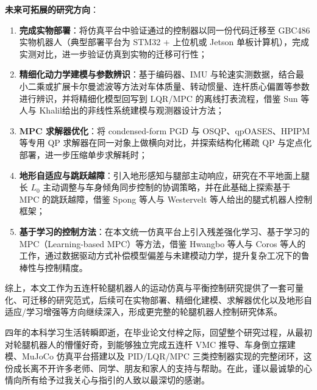 \documentclass{smbuthesis}
\begin{document}
\textbf{未来可拓展的研究方向}：

\begin{enumerate}
\item \textbf{完成实物部署}：将仿真平台中验证通过的控制器以同一份代码迁移至 GBC486 实物机器人（典型部署平台为 STM32 + 上位机或 Jetson 单板计算机），完成实测对比，进一步验证仿真到实物的迁移可行性；
\item \textbf{精细化动力学建模与参数辨识}：基于编码器、IMU 与轮速实测数据，结合最小二乘或扩展卡尔曼滤波等方法对车体质量、转动惯量、连杆质心偏置等参数进行辨识，并将精细化模型回写到 LQR/MPC 的离线打表流程，借鉴 Sun 等人\cite{Sun2020SMDOB}与 Khalil\cite{Khalil2002Nonlinear}给出的非线性系统建模与观测器设计方法；
\item \textbf{MPC 求解器优化}：将 condensed-form PGD 与 OSQP\cite{Stellato2020OSQP}、qpOASES、HPIPM 等专用 QP 求解器在同一对象上做横向对比，并探索结构化稀疏 QP 与定点化部署，进一步压缩单步求解耗时；
\item \textbf{地形自适应与跳跃越障}：引入地形感知与腿部主动响应，研究在不平地面上腿长 $L_0$ 主动调整与车身倾角同步控制的协调策略，并在此基础上探索基于 MPC 的跳跃越障，借鉴 Spong 等人\cite{Spong2005RobotModeling}与 Westervelt 等人\cite{Westervelt2007Bipedal}给出的腿式机器人控制框架；
\item \textbf{基于学习的控制方法}：在本文统一仿真平台上引入残差强化学习、基于学习的 MPC（Learning-based MPC）等方法，借鉴 Hwangbo 等人\cite{Hwangbo2019Agile}与 Coros 等人\cite{Coros2011Quadruped,Geilinger2018Skaterbots}的工作，通过数据驱动方式补偿模型偏差与未建模动力学，提升复杂工况下的鲁棒性与控制精度。
\end{enumerate}

综上，本文工作为五连杆轮腿机器人的运动仿真与平衡控制研究提供了一套可量化、可迁移的研究范式，后续可在实物部署、精细化建模、求解器优化以及地形自适应/学习增强等方向继续深入，形成更完整的轮腿机器人控制研究体系。

\printsmburefs


四年的本科学习生活转瞬即逝，在毕业论文付梓之际，回望整个研究过程，从最初对轮腿机器人的懵懂好奇，到能够独立完成五连杆 VMC 推导、车身倒立摆建模、MuJoCo 仿真平台搭建以及 PID/LQR/MPC 三类控制器实现的完整闭环，这份成长离不开许多老师、同学、朋友和家人的支持与帮助。在此，谨以最诚挚的心情向所有给予过我关心与指引的人致以最深切的感谢。
\end{document}
